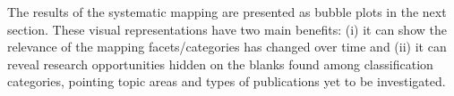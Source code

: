 
The results of the systematic mapping are presented as
bubble plots in the next section. These visual representations have two main
benefits: (i) it can show the relevance of the mapping facets/categories
has changed over time and (ii) it can reveal research opportunities
hidden on the blanks found among classification categories, pointing
topic areas and types of publications yet to be investigated.




